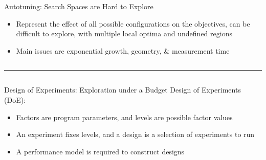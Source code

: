 \documentclass[11pt, compress, aspectratio=169, xcolor={table,usenames,dvipsnames}]{beamer}
\begin{document}
\begin{frame}
\begin{columns}
\begin{column}{0.89\columnwidth}
\begin{columns}
\begin{column}[t]{0.48\columnwidth}
\begin{block}{Autotuning: Search Spaces are Hard to Explore}
\begin{itemize}
\item Represent the \alert{effect} of all possible
\alert{configurations} on the \alert{objectives}, can be difficult to explore,
with multiple \alert{local optima} and \alert{undefined regions}
\item \alert{Main issues} are \alert{exponential growth}, \alert{geometry}, \& \alert{measurement time}
\end{itemize}
\end{block}
\end{column}
\end{columns}

\vspace{0.2em}
\rule{\columnwidth}{0.4ex}
\vspace{-2.5em}
\begin{columns}
\begin{column}[t]{0.48\columnwidth}
\begin{block}{Design of Experiments: Exploration under a Budget}
\alert{Design of Experiments} (\alert{DoE}):
\vspace{1em}
\begin{itemize}
\item \alert{Factors} are program \alert{parameters},
and \alert{levels} are possible factor \alert{values}
\item An \alert{experiment} fixes levels,
and a \alert{design} is a \alert{selection} of experiments to \alert{run}
\item A \alert{performance model} is required to \alert{construct designs}
\end{itemize}


\end{block}
\end{column}
\end{columns}
\end{column}
\end{columns}
\end{frame}
\end{document}
